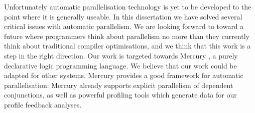 Unfortunately automatic parallelisation technology is yet to be developed to the
point where it is generally useable.
In this dissertation we have solved several critical issues with automatic
parallelism.
We are looking forward to toward a future where programmers think about
parallelism no more than they currently think about traditional compiler
optimisations,
and we think that this work is a step in the right direction.
Our work is targeted towards Mercury \citep{mercury_jlp},
a purely declarative logic programming language.
We believe that our work could be adapted for other systems.
Mercury provides a good framework for automatic parallelisation:
Mercury already supports explicit parallelism of dependent conjunctions,
as well as powerful profiling tools which generate data for our profile
feedback analyses.

% 



